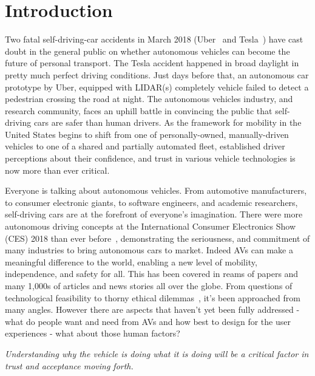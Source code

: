 \section{Introduction}
\label{sec:introduction}


Two fatal self-driving-car accidents in March 2018 (Uber~\cite{uber} and Tesla~\cite{tesla}) have cast doubt in the general public on whether autonomous vehicles can become the future of personal transport. 
The Tesla accident happened in broad daylight in pretty much perfect driving conditions. Just days before that, an autonomous car prototype by Uber, equipped with LIDAR(s) completely vehicle failed to detect a pedestrian crossing the road at night. 
The autonomous vehicles industry, and research community, faces an uphill battle in convincing the public that self-driving cars are safer than human drivers.
As the framework for mobility in the United States begins to shift from one of personally-owned, manually-driven vehicles to one of a shared and partially automated fleet, established driver perceptions about their confidence, and trust in various vehicle technologies is now more than ever critical.

Everyone is talking about autonomous vehicles. 
From automotive manufacturers, to consumer electronic giants, to software engineers, and academic researchers, self-driving cars are at the forefront of everyone’s imagination. 
There were more autonomous driving concepts at the International Consumer Electronics Show (CES) 2018 than ever before~\cite{techcrunch_2018}, demonstrating the seriousness, and commitment of many industries to bring autonomous cars to market.
Indeed AVs can make a meaningful difference to the world, enabling a new level of mobility, independence, and safety for all. 
This has been covered in reams of papers and many 1,000s of articles and news stories all over the globe. 
From questions of technological feasibility to thorny ethical dilemmas~\cite{lin2016ethics}, it’s been approached from many angles.
However there are aspects that haven’t yet been fully addressed - what do people want and need from AVs and how best to design for the user experiences - what about those human factors?

\textit{Understanding why the vehicle is doing what it is doing will be a critical factor in trust and acceptance moving forth.}


